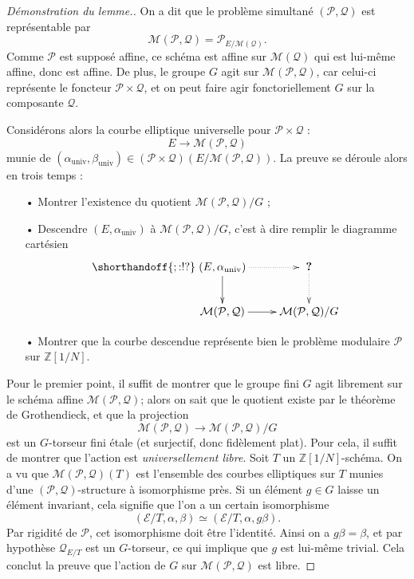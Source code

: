 \documentclass[11pt,a4paper]{article}
\newcommand{\Z}{\mathbb{Z}}
\newcommand{\E}{\mathcal{E}}
\renewcommand{\Pr}{\mathcal{P}}
\newcommand{\Qr}{\mathcal{Q}}
\newcommand{\M}{\mathcal{M}}
\newcommand{\vers}{\longrightarrow}
\theoremstyle{definition}
\begin{document}
\begin{proof}[Démonstration du lemme.] On a dit que le problème simultané $(\Pr, \Qr)$ est représentable par
$$\M(\Pr, \Qr) = \Pr_{E/\M(\Qr)}.$$
Comme $\Pr$ est supposé affine, ce schéma est affine sur $\M(\Qr)$ qui est lui-même affine, donc est affine. De plus, le groupe $G$ agit sur $\M(\Pr, \Qr)$, car celui-ci représente le foncteur $\Pr\times\Qr$, et on peut faire agir fonctoriellement $G$ sur la composante $\Qr$.

\newcommand{\univ}{\mathrm{univ}}

Considérons alors la courbe elliptique universelle pour $\Pr\times\Qr$ :
$$E \vers \M(\Pr,\Qr)$$
munie de $(\alpha_{\univ}, \beta_{\univ}) \in (\Pr\times\Qr)(E/\M(\Pr,\Qr)).$ La preuve se déroule alors en trois temps :
\begin{itemize}
\item[•] Montrer l'existence du quotient $\M(\Pr,\Qr)/G$ ;
\item[•] Descendre $(E, \alpha_{\univ})$ à $\M(\Pr,\Qr)/G$, c'est à dire remplir le diagramme cartésien
$$
\shorthandoff{;:!?}
\xymatrix {
(E,\alpha_{\univ}) \ar[d] \ar@{.>}[r] &\ \textbf{?}\ \ar@{.>}[d] \\
 \M(\Pr,\Qr) \ar[r] & \M(\Pr,\Qr)/G
}
$$
\item[•] Montrer que la courbe descendue représente bien le problème modulaire $\Pr$ sur $\Z[1/N]$.
\end{itemize}

Pour le premier point, il suffit de montrer que le groupe fini $G$ agit librement sur le schéma affine $\M(\Pr,\Qr)$; alors on sait que le quotient existe par le théorème de Grothendieck, et que la projection
$$\M(\Pr,\Qr)\vers \M(\Pr,\Qr)/G$$
est un $G$-torseur fini étale (et surjectif, donc fidèlement plat). Pour cela, il suffit de montrer que l'action est \emph{universellement libre}. Soit $T$ un $\Z[1/N]$-schéma. On a vu que $\M(\Pr, \Qr)(T)$ est l'ensemble des courbes elliptiques sur $T$ munies d'une $(\Pr,\Qr)$-structure à isomorphisme près. Si un élément $g\in G$ laisse un élément invariant, cela signifie que l'on a un certain isomorphisme
$$(\E/T, \alpha, \beta) \simeq (\E/T, \alpha, g\beta).$$
Par rigidité de $\Pr$, cet isomorphisme doit être l'identité. Ainsi on a $g\beta = \beta$, et par hypothèse $\Qr_{E/T}$ est un $G$-torseur, ce qui implique que $g$ est lui-même trivial. Cela conclut la preuve que l'action de $G$ sur $\M(\Pr,\Qr)$ est libre.


\end{proof}
\end{document}
